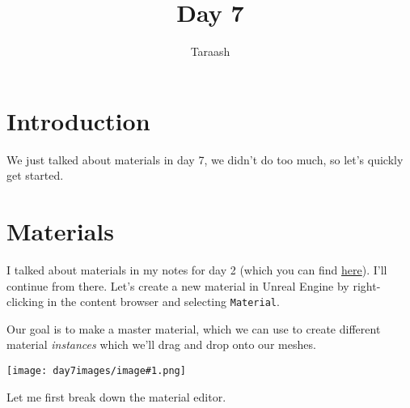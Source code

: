 \documentclass{article}
\title{Day 7}
\author{Taraash}
\date{}
\begin{document}
\newcommand{\img}[1]{
    \begin{figure*}[h]
        \centering
        \texttt{[image: day7images/image\#1.png]}
    \end{figure*}
}

\newcommand{\imgs}[2]{
    \begin{figure*}[h]
        \centering
        \texttt{[image: day7images/image\#1.png]}
    \end{figure*}
}

\newcommand{\imgc}[2]{
    \begin{figure*}[h]
        \centering
        \texttt{[image: day7images/image\#1.png]}
        \caption{#2}
    \end{figure*}
}
\newcommand{\imgcs}[3]{
    \begin{figure*}[h]
        \centering
        \texttt{[image: day7images/image\#1.png]}
        \caption{#2}
    \end{figure*}
}

\maketitle

\tableofcontents
\newpage

\section{Introduction}
We just talked about materials in day 7, we didn't do too much, so let's quickly get started.

\section{Materials}
I talked about materials in my notes for day 2 (which you can find \href{https://github.com/T-Cent/Notes-for-Unreal-Engine/blob/main/Day%202.pdf}{here}).
I'll continue from there. Let's create a new material in Unreal Engine by right-clicking in the content browser and selecting \verb|Material|.

Our goal is to make a master material, which we can use to create different material \emph{instances} which we'll drag and drop onto our meshes.


\img{1}



Let me first break down the material editor.
\end{document}
